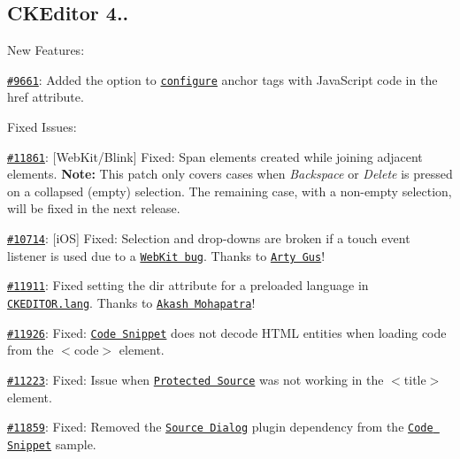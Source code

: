 \subsection*{C\+K\+Editor 4..}

New Features\+:


\begin{DoxyItemize}
\item \href{http://dev.ckeditor.com/ticket/9661}{\tt \#9661}\+: Added the option to \href{http://docs.ckeditor.com/#!/api/CKEDITOR.config-cfg-linkJavaScriptLinksAllowed}{\tt configure} anchor tags with Java\+Script code in the {\ttfamily href} attribute.
\end{DoxyItemize}

Fixed Issues\+:


\begin{DoxyItemize}
\item \href{http://dev.ckeditor.com/ticket/11861}{\tt \#11861}\+: \mbox{[}Web\+Kit/\+Blink\mbox{]} Fixed\+: Span elements created while joining adjacent elements. {\bfseries Note\+:} This patch only covers cases when {\itshape Backspace} or {\itshape Delete} is pressed on a collapsed (empty) selection. The remaining case, with a non-\/empty selection, will be fixed in the next release.
\item \href{http://dev.ckeditor.com/ticket/10714}{\tt \#10714}\+: \mbox{[}i\+OS\mbox{]} Fixed\+: Selection and drop-\/downs are broken if a touch event listener is used due to a \href{https://bugs.webkit.org/show_bug.cgi?id=128924}{\tt Web\+Kit bug}. Thanks to \href{https://github.com/artygus}{\tt Arty Gus}!
\item \href{http://dev.ckeditor.com/ticket/11911}{\tt \#11911}\+: Fixed setting the {\ttfamily dir} attribute for a preloaded language in \href{http://docs.ckeditor.com/#!/api/CKEDITOR.lang}{\tt C\+K\+E\+D\+I\+T\+O\+R.\+lang}. Thanks to \href{https://github.com/akashmohapatra}{\tt Akash Mohapatra}!
\item \href{http://dev.ckeditor.com/ticket/11926}{\tt \#11926}\+: Fixed\+: \href{http://ckeditor.com/addon/codesnippet}{\tt Code Snippet} does not decode H\+T\+ML entities when loading code from the {\ttfamily $<$code$>$} element.
\item \href{http://dev.ckeditor.com/ticket/11223}{\tt \#11223}\+: Fixed\+: Issue when \href{http://docs.ckeditor.com/#!/api/CKEDITOR.config-cfg-protectedSource}{\tt Protected Source} was not working in the {\ttfamily $<$title$>$} element.
\item \href{http://dev.ckeditor.com/ticket/11859}{\tt \#11859}\+: Fixed\+: Removed the \href{http://ckeditor.com/addon/sourcedialog}{\tt Source Dialog} plugin dependency from the \href{http://ckeditor.com/addon/codesnippet}{\tt Code Snippet} sample.

\end{DoxyItemize}
